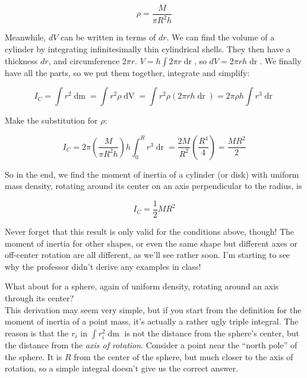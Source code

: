\documentclass[12pt,a4paper]{report}
\begin{document}
\begin{equation}
\rho = \frac{M}{\pi R^2 h}
\end{equation}

Meanwhile, $dV$ can be written in terms of $dr$. We can find the volume of a cylinder by integrating infinitesimally thin cylindrical shells. They then have a thickness $dr$, and circumference $2 \pi r$. $V = h \int 2 \pi r \mathop{dr}$, so $dV = 2 \pi r h \mathop{dr}$. We finally have all the parts, so we put them together, integrate and simplify:

\begin{equation}
I_C = \int r^2 \mathop{dm} = \int r^2 \rho \mathop{dV} = \int r^2 \rho (2 \pi r h \mathop{dr}) = 2 \pi \rho h \int r^3 \mathop{dr}
\end{equation}

Make the substitution for $\rho$:

\begin{equation}
I_C = 2 \pi \left( \frac{M}{\pi R^2 h}\right) h \int_0^R r^3 \mathop{dr} = \frac{2 M}{R^2} \left(\frac{R^4}{4}\right) = \frac{M R^2}{2}
\end{equation}

So in the end, we find the moment of inertia of a cylinder (or disk) with uniform mass density, rotating around its center on an axis perpendicular to the radius, is 

\begin{equation}
I_C = \frac{1}{2} M R^2
\end{equation}

Never forget that this result is only valid for the conditions above, though! The moment of inertia for other shapes, or even the same shape but different axes or off-center rotation are all different, as we'll see rather soon. I'm starting to see why the professor didn't derive any examples in class!

What about for a sphere, again of uniform density, rotating around an axis through its center?\\
This derivation may seem very simple, but if you start from the definition for the moment of inertia of a point mass, it's actually a rather ugly triple integral. The reason is that the $r_i$ in $\int r_i^2 \mathop{dm}$ is not the distance from the sphere's center, but the distance from the \emph{axis of rotation}. Consider a point near the ``north pole'' of the sphere. It is $R$ from the center of the sphere, but much closer to the axis of rotation, so a simple integral doesn't give us the correct answer.
\end{document}
